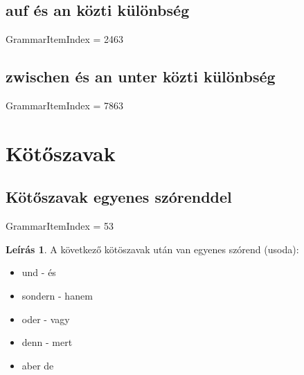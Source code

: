 \documentclass{article}
\theoremstyle{definition}
\newtheorem*{desc}{Leírás}
\begin{document}
\subsection{auf és an közti különbség}

GrammarItemIndex = 2463

\subsection{zwischen és an unter közti különbség}

GrammarItemIndex = 7863

\section{Kötőszavak}

\subsection{Kötőszavak egyenes szórenddel}

GrammarItemIndex = 53

\begin{desc}
A következő kötöszavak után van egyenes szórend (usoda):
\begin{itemize}
\item und - és
\item sondern - hanem
\item oder - vagy
\item denn - mert
\item aber  de
\end{itemize}
\end{desc}
\end{document}
